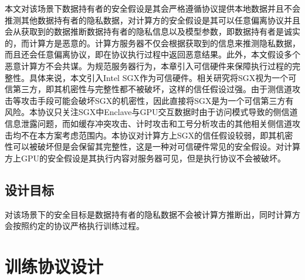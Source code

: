 
本文对该场景下数据持有者的安全假设是其会严格遵循协议提供本地数据并且不会推测其他数据持有者的隐私数据，对计算方的安全假设是其可以任意偏离协议并且会从获取到的数据推断数据持有者的隐私信息以及模型参数，即数据持有者是诚实的，而计算方是恶意的。计算方服务器不仅会根据获取到的信息来推测隐私数据，而且还会任意偏离协议，即在协议执行过程中返回恶意结果。此外，本文假设多个恶意计算方不会共谋。为规范服务器行为，本章引入可信硬件来保障执行过程的完整性。具体来说，本文引入Intel SGX\cite{SGX_Explained}作为可信硬件。相关研究将SGX视为一个可信第三方，即其机密性与完整性都不被破坏，这样的信任假设过强。由于测信道攻击等攻击手段可能会破坏SGX的机密性\cite{SGX_Attack}，因此直接将SGX是为一个可信第三方有风险。本协议只关注SGX中Enclave与GPU交互数据时由于访问模式导致的侧信道信息泄露问题，而如缓存冲突攻击、计时攻击和工号分析攻击的其他相关侧信道攻击均不在本方案考虑范围内。本协议对计算方上SGX的信任假设较弱，即其机密性可以被破坏但是会保留其完整性，这是一种对可信硬件常见的安全假设\cite{Cryptflow}。对计算方上GPU的安全假设是其执行内容对服务器可见，但是执行协议不会被破坏。


\subsection{设计目标}

对该场景下的安全目标是数据持有者的隐私数据不会被计算方推断出，同时计算方会按照约定的协议严格执行训练过程。


\section{训练协议设计} \label{chap4_train_protocol}

